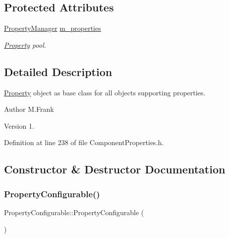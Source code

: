 \subsection*{Protected Attributes}
\begin{DoxyCompactItemize}
\item 
\hyperlink{class_d_d4hep_1_1_property_manager}{Property\+Manager} \hyperlink{class_d_d4hep_1_1_property_configurable_a5c68f50853fc154e348be09d10d3f0cf}{m\+\_\+properties}
\begin{DoxyCompactList}\small\item\em \hyperlink{class_d_d4hep_1_1_property}{Property} pool. \end{DoxyCompactList}\end{DoxyCompactItemize}


\subsection{Detailed Description}
\hyperlink{class_d_d4hep_1_1_property}{Property} object as base class for all objects supporting properties. 

\begin{DoxyAuthor}{Author}
M.\+Frank 
\end{DoxyAuthor}
\begin{DoxyVersion}{Version}
1. 
\end{DoxyVersion}


Definition at line 238 of file Component\+Properties.\+h.



\subsection{Constructor \& Destructor Documentation}
\hypertarget{class_d_d4hep_1_1_property_configurable_a06572f4bb82632232b0b503f56fda784}{}\label{class_d_d4hep_1_1_property_configurable_a06572f4bb82632232b0b503f56fda784} 
\subsubsection{\texorpdfstring{Property\+Configurable()}{PropertyConfigurable()}}
{\footnotesize\ttfamily Property\+Configurable\+::\+Property\+Configurable (\begin{DoxyParamCaption}{ }\end{DoxyParamCaption})}



